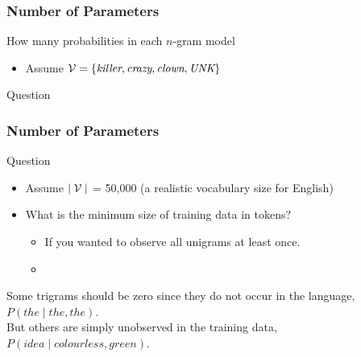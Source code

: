 \begin{frame}
\frametitle{Number of Parameters}
\begin{block}{How many probabilities in each $n$-gram model}
\begin{itemize}
\item Assume ${\cal V} = \{ \textit{killer}, \textit{crazy}, \textit{clown}, \textit{UNK} \}$
\end{itemize}
\end{block}
\pause
\begin{alertblock}{Question}
\end{alertblock}
\end{frame}

\begin{frame}
\frametitle{Number of Parameters}
\begin{alertblock}{Question}
\begin{itemize}
\item Assume $\mid {\cal V} \mid$ = 50,000 (a realistic vocabulary size for English)
\item What is the minimum size of training data in tokens?
\begin{itemize}
\item If you wanted to observe all unigrams at least once.
\item {}
\end{itemize}
\end{itemize}
\end{alertblock}
\bigskip
\begin{block}{}
Some trigrams should be zero since they do not occur in the language, $P(the \mid the, the)$. \\
But others are simply unobserved in the training data, $P(idea \mid colourless, green)$.
\end{block}
\end{frame}


